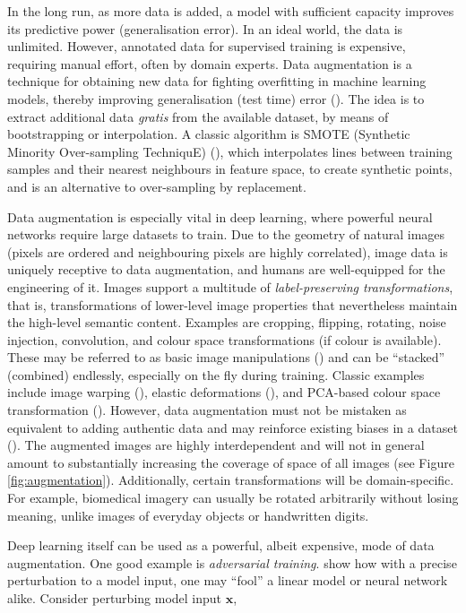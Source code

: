 In the long run, as more data is added, a model with sufficient capacity improves its predictive power (generalisation error). In an ideal world, the data is unlimited. However, annotated data for supervised training is expensive, requiring manual effort, often by domain experts. Data augmentation is a technique for obtaining new data for fighting overfitting in machine learning models, thereby improving generalisation (test time) error (\cite{shorten2019survey}). The idea is to extract additional data \emph{gratis} from the available dataset, by means of bootstrapping or interpolation. A classic algorithm is SMOTE (Synthetic Minority Over-sampling TechniquE) (\cite{chawla2002smote}), which interpolates lines between training samples and their nearest neighbours in feature space, to create synthetic points, and is an alternative to over-sampling by replacement.

Data augmentation is especially vital in deep learning, where powerful neural networks require large datasets to train. Due to the geometry of natural images (pixels are ordered and neighbouring pixels are highly correlated), image data is uniquely receptive to data augmentation, and humans are well-equipped for the engineering of it. Images support a multitude of \emph{label-preserving transformations}, that is, transformations of lower-level image properties that nevertheless maintain the high-level semantic content. Examples are cropping, flipping, rotating, noise injection, convolution, and colour space transformations (if colour is available). These may be referred to as basic image manipulations (\cite{shorten2019survey}) and can be ``stacked'' (combined) endlessly, especially on the fly during training. Classic examples include image warping (\cite{lecun1998gradient}), elastic deformations (\cite{simard2003best}), and PCA-based colour space transformation (\cite{krizhevsky2012imagenet}). However, data augmentation must not be mistaken as equivalent to adding authentic data and may reinforce existing biases in a dataset (\cite{shorten2019survey}). The augmented images are highly interdependent and will not in general amount to substantially increasing the coverage of space of all images (see Figure \ref{fig:augmentation}). Additionally, certain transformations will be domain-specific. For example, biomedical imagery can usually be rotated arbitrarily without losing meaning, unlike images of everyday objects or handwritten digits.

Deep learning itself can be used as a powerful, albeit expensive, mode of data augmentation. One good example is \emph{adversarial training}. \cite{goodfellow2014explaining} show how with a precise perturbation to a model input, one may ``fool'' a linear model or neural network alike. Consider perturbing model input $\mathbf{x}$,

